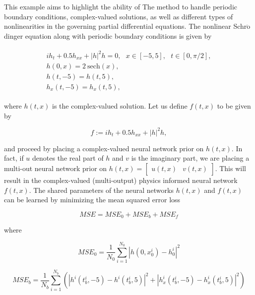 \documentclass[book.tex]{subfiles}
\begin{document}
\begin{example}

This example aims to highlight the ability of The method to handle periodic boundary conditions, complex-valued solutions, as well as different types of nonlinearities in the governing partial differential equations. The nonlinear Schr$\mathrm{\ddot{o}}$dinger equation along with periodic boundary conditions is given by


\begin{align}
\begin{split}
i h_t + 0.5 h_{xx} + |h|^2 h = 0,\ \ \ x \in [-5, 5],\ \ \ t \in [0, \pi/2],\\
h(0,x) = 2\ \mathrm{sech}(x),\\
h(t,-5) = h(t, 5),\\
h_x(t,-5) = h_x(t, 5),
\end{split}
\end{align}


where $h(t,x)$ is the complex-valued solution. Let us define $f(t,x)$ to be given by

\begin{equation}
    f := i h_t + 0.5 h_{xx} + |h|^2 h,    
\end{equation}

and proceed by placing a complex-valued neural network prior on $h(t,x)$. In fact, if $u$ denotes the real part of $h$ and $v$ is the imaginary part, we are placing a multi-out neural network prior on $h(t,x) = \begin{bmatrix}
u(t,x) & v(t,x)
\end{bmatrix}$. This will result in the complex-valued (multi-output) physics informed neural network $f(t,x)$. The shared parameters of the neural networks $h(t,x)$ and $f(t,x)$ can be learned by minimizing the mean squared error loss

\begin{equation}
    MSE = MSE_0 + MSE_b + MSE_f    
\end{equation}


where

\begin{equation}
MSE_0 = \frac{1}{N_0}\sum_{i=1}^{N_0} |h(0,x_0^i) - h^i_0|^2    
\end{equation}


\begin{equation}
MSE_b = \frac{1}{N_b}\sum_{i=1}^{N_b} \left(|h^i(t^i_b,-5) - h^i(t^i_b,5)|^2 + |h^i_x(t^i_b,-5) - h^i_x(t^i_b,5)|^2\right)    
\end{equation}



\end{example}
\end{document}
